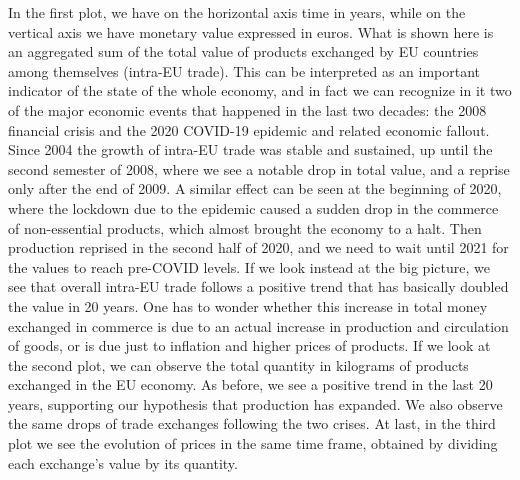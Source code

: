 In the first plot, we have on the horizontal axis time in years, while on the vertical axis we have monetary value expressed in euros. What is shown here is an aggregated sum of the total value of products exchanged by EU countries among themselves (intra-EU trade). This can be interpreted as an important indicator of the state of the whole economy, and in fact we can recognize in it two of the major economic events that happened in the last two decades: the 2008 financial crisis and the 2020 COVID-19 epidemic and related economic fallout. Since 2004 the growth of intra-EU trade was stable and sustained, up until the second semester of 2008, where we see a notable drop in total value, and a reprise only after the end of 2009. A similar effect can be seen at the beginning of 2020, where the lockdown due to the epidemic caused a sudden drop in the commerce of non-essential products, which almost brought the economy to a halt. Then production reprised in the second half of 2020, and we need to wait until 2021 for the values to reach pre-COVID levels.
If we look instead at the big picture, we see that overall intra-EU trade follows a positive trend that has basically doubled the value in 20 years. One has to wonder whether this increase in total money exchanged in commerce is due to an actual increase in production and circulation of goods, or is due just to inflation and higher prices of products. If we look at the second plot, we can observe the total quantity in kilograms of products exchanged in the EU economy. As before, we see a positive trend in the last 20 years, supporting our hypothesis that production has expanded. We also observe the same drops of trade exchanges following the two crises.
At last, in the third plot we see the evolution of prices in the same time frame, obtained by dividing each exchange's value by its quantity.




